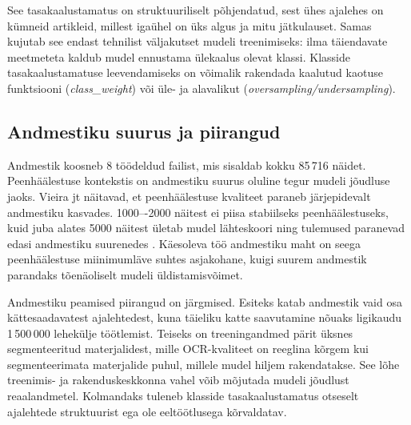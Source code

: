 See tasakaalustamatus on struktuuriliselt põhjendatud, sest ühes ajalehes on kümneid artikleid, millest igaühel on üks algus ja mitu jätkulauset. Samas kujutab see endast tehnilist väljakutset mudeli treenimiseks: ilma täiendavate meetmeteta kaldub mudel ennustama ülekaalus olevat klassi. Klasside tasakaalustamatuse leevendamiseks on võimalik rakendada kaalutud kaotuse funktsiooni (\textit{class\_weight}) või üle- ja alavalikut (\textit{oversampling/undersampling}).

\subsection{Andmestiku suurus ja piirangud}\label{subsec:andmestiku-suurus}
Andmestik koosneb 8 töödeldud failist, mis sisaldab kokku 85\,716 näidet. Peenhäälestuse kontekstis on andmestiku suurus oluline tegur mudeli jõudluse jaoks. Vieira jt näitavad, et peenhäälestuse kvaliteet paraneb järjepidevalt andmestiku kasvades. 1000–-2000 näitest ei piisa stabiilseks peenhäälestuseks, kuid juba alates 5000 näitest ületab mudel lähteskoori ning tulemused paranevad edasi andmestiku suurenedes \cite{vieira2024}. Käesoleva töö andmestiku maht on seega peenhäälestuse miinimumläve suhtes asjakohane, kuigi suurem andmestik parandaks tõenäoliselt mudeli üldistamisvõimet.

Andmestiku peamised piirangud on järgmised. Esiteks katab andmestik vaid osa kättesaadavatest ajalehtedest, kuna täieliku katte saavutamine nõuaks ligikaudu 1\,500\,000 lehekülje töötlemist. Teiseks on treeningandmed pärit üksnes segmenteeritud materjalidest, mille OCR-kvaliteet on reeglina kõrgem kui segmenteerimata materjalide puhul, millele mudel hiljem rakendatakse. See lõhe treenimis- ja rakenduskeskkonna vahel võib mõjutada mudeli jõudlust reaalandmetel. Kolmandaks tuleneb klasside tasakaalustamatus otseselt ajalehtede struktuurist ega ole eeltöötlusega kõrvaldatav.
